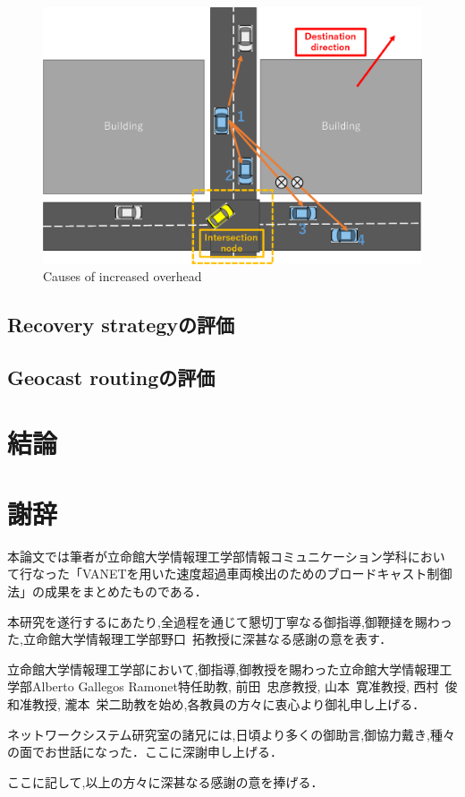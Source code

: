 \documentclass[10pt]{jreport}
\begin{document}
\begin{figure}[!ht]
	\centering
	\includegraphics[width=120mm]{figures/overhead_reason.eps}
	\caption{Causes of increased overhead}
	\label{fig:overhead_reason}
\end{figure}


\section{Recovery strategyの評価}
\label{Recovery_evaluation}
\section{Geocast routingの評価}
\label{Geocast_evaluation}


\chapter{結論}



\chapter*{謝辞}
\sloppy
本論文では筆者が立命館大学情報理工学部情報コミュニケーション学科におい
て行なった「VANETを用いた速度超過車両検出のためのブロードキャスト制御法」の成果をまとめたものである．

本研究を遂行するにあたり,全過程を通じて懇切丁寧なる御指導,御鞭撻を賜わっ
た,立命館大学情報理工学部野口~拓教授に深甚なる感謝の意を表す．

立命館大学情報理工学部において,御指導,御教授を賜わった立命館大学情報理工学部Alberto Gallegos Ramonet特任助教, 前田~忠彦教授, 山本~寛准教授, 西村~俊和准教授, 瀧本~栄二助教を始め,各教員の方々に衷心より御礼申し上げる．


ネットワークシステム研究室の諸兄には,日頃より多くの御助言,御協力戴き,種々の面でお世話になった．ここに深謝申し上げる．

ここに記して,以上の方々に深甚なる感謝の意を捧げる．





\end{document}
